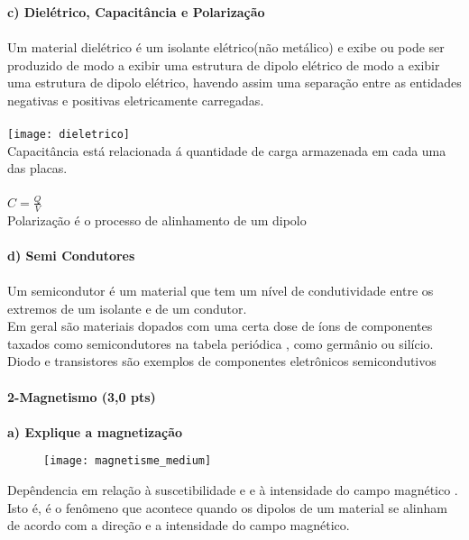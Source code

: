\documentclass[11pt,a4paper]{article}
\begin{document}
\textbf{c) Dielétrico, Capacitância e Polarização}\\\\
Um material dielétrico é um isolante elétrico(não metálico) e exibe ou pode ser produzido de modo a exibir uma estrutura de dipolo elétrico de modo a exibir uma estrutura de dipolo elétrico, havendo assim uma separação entre as entidades negativas e positivas eletricamente carregadas.\\\\
\texttt{[image: dieletrico]}
\\Capacitância está relacionada á quantidade de carga armazenada em cada uma das placas.\\\\
$C=\frac{Q}{V}$\\
Polarização é o processo de alinhamento de um dipolo\\\\
\textbf{d) Semi Condutores}\\\\
Um semicondutor é um material que tem um nível de condutividade entre os extremos de um isolante e de um condutor.\\
Em geral são materiais dopados com uma certa dose de íons de componentes taxados como semicondutores na tabela periódica , como germânio ou silício.\\
Diodo e transistores são exemplos de componentes eletrônicos semicondutivos
\\\\
\textbf{2-Magnetismo (3,0 pts)}\\\\
\textbf{a) Explique a magnetização}\\
\begin{figure}[!htb]
\texttt{[image: magnetisme\_medium]}\\
\end{figure}
Depêndencia em relação à suscetibilidade e e à intensidade do campo magnético .\\
Isto é, é o fenômeno que acontece quando os dipolos de um material se alinham de acordo com a direção e a intensidade do campo magnético.
\\\\
\end{document}
